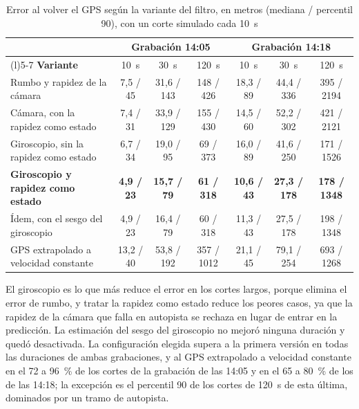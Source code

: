 \begin{table}[H]
\centering
\caption[Error al volver el GPS según la variante del filtro]{Error al volver el GPS según la variante del filtro, en metros (mediana / percentil 90), con un corte simulado cada 10~s}
\label{tab:res-filtro}
\footnotesize
\begin{tabularx}{\textwidth}{@{}>{\raggedright\arraybackslash}X*{6}{c}@{}}
\toprule
& \multicolumn{3}{c}{\textbf{Grabación 14:05}} & \multicolumn{3}{c}{\textbf{Grabación 14:18}} \\
\cmidrule(lr){2-4}\cmidrule(l){5-7}
\textbf{Variante} & 10~s & 30~s & 120~s & 10~s & 30~s & 120~s \\
\midrule
Rumbo y rapidez de la cámara & 7,5 / 45 & 31,6 / 143 & 148 / 426 & 18,3 / 89 & 44,4 / 336 & 395 / 2194 \\
Cámara, con la rapidez como estado & 7,4 / 31 & 33,9 / 129 & 155 / 430 & 14,5 / 60 & 52,2 / 302 & 421 / 2121 \\
Giroscopio, sin la rapidez como estado & 6,7 / 34 & 19,0 / 95 & 69 / 373 & 16,0 / 89 & 41,6 / 250 & 171 / 1526 \\
\textbf{Giroscopio y rapidez como estado} & \textbf{4,9 / 23} & \textbf{15,7 / 79} & \textbf{61 / 318} & \textbf{10,6 / 43} & \textbf{27,3 / 178} & \textbf{178 / 1348} \\
Ídem, con el sesgo del giroscopio & 4,9 / 23 & 16,4 / 79 & 60 / 318 & 11,3 / 43 & 27,5 / 178 & 198 / 1348 \\
\addlinespace
GPS extrapolado a velocidad constante & 13,2 / 40 & 53,8 / 192 & 357 / 1012 & 21,1 / 45 & 79,1 / 254 & 693 / 1268 \\
\bottomrule
\end{tabularx}
\end{table}

El giroscopio es lo que más reduce el error en los cortes largos, porque elimina el error de rumbo, y tratar la rapidez como estado reduce los peores casos, ya que la rapidez de la cámara que falla en autopista se rechaza en lugar de entrar en la predicción.
La estimación del sesgo del giroscopio no mejoró ninguna duración y quedó desactivada.
La configuración elegida supera a la primera versión en todas las duraciones de ambas grabaciones, y al GPS extrapolado a velocidad constante en el 72 a 96~\% de los cortes de la grabación de las 14:05 y en el 65 a 80~\% de los de las 14:18; la excepción es el percentil 90 de los cortes de 120~s de esta última, dominados por un tramo de autopista.

